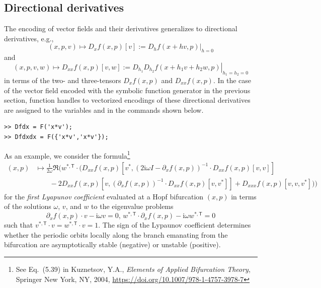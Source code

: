\subsection{Directional derivatives}
\label{sec: Directional derivatives}
The encoding of vector fields and their derivatives generalizes to directional derivatives, e.g.,
\[
(x,p,v)\mapsto D_xf(x,p)[v]:=\left.D_hf(x+hv,p)\right|_{h=0}
\]
and
\[
(x,p,v,w)\mapsto D_{xx}f(x,p)[v,w]:=\left.D_{h_1}D_{h_2}f(x+h_1v+h_2w,p)\right|_{h_1=h_2=0}
\]
in terms of the two- and three-tensors $D_xf(x,p)$ and $D_{xx}f(x,p)$. In the case of the vector field encoded with the symbolic function generator in the previous section, function handles to vectorized encodings of these directional derivatives are assigned to the variables  and  in the commands shown below.
\begin{lstlisting}[language=coco-highlight,frame=lines]
>> Dfdx = F('x*v');
>> Dfdxdx = F({'x*v','x*v'});
\end{lstlisting}

As an example, we consider the formula\footnote{See Eq.~(5.39) in Kuznetsov, Y.A., \emph{Elements of Applied Bifurcation Theory}, Springer New York, NY, 2004, \url{https://doi.org/10.1007/978-1-4757-3978-7}}
\begin{align*}
(x,p)&\mapsto\frac{1}{2\omega}\Re\bigg(w^{\ast,\mathsf{T}}\cdot\big(D_{xx}f(x,p)\left[v^\ast,\left(2\mathrm{i}\omega I-\partial_xf(x,p)\right)^{-1}\cdot D_{xx}f(x,p)[v,v]\right]\\
&\qquad-2D_{xx}f(x,p)\left[v,(\partial_xf(x,p))^{-1}\cdot D_{xx}f(x,p)\left[v,v^\ast\right]\right]+D_{xxx}f(x,p)\left[v,v,v^\ast\right]\big)\bigg)
\end{align*}
for the \textit{first Lyapunov coefficient} evaluated at a Hopf bifurcation $(x,p)$ in terms of the solutions $\omega$, $v$, and $w$ to the eigenvalue problems
\[
\partial_xf(x,p)\cdot v-\mathrm{i}\omega v=0,\,w^{\ast,\mathsf{T}}\cdot\partial_xf(x,p)-\mathrm{i}\omega w^{\ast,\mathsf{T}}=0
\]
such that $v^{\ast,\mathsf{T}}\cdot v=w^{\ast,\mathsf{T}}\cdot v=1$. The sign of the Lypaunov coefficient determines whether the periodic orbits locally along the branch emanating from the bifurcation are asymptotically stable (negative) or unstable (positive).

